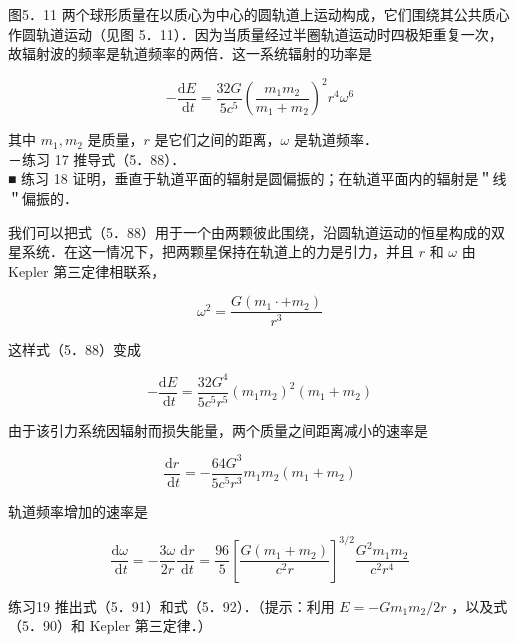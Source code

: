 图5．11 两个球形质量在以质心为中心的圆轨道上运动构成，它们围绕其公共质心作圆轨道运动（见图 5．11）．因为当质量经过半圈轨道运动时四极矩重复一次，故辐射波的频率是轨道频率的两倍．这一系统辐射的功率是


\begin{equation*}
	-\frac{\mathrm{d} E}{\mathrm{~d} t}=\frac{32 G}{5 c^{5}}\left(\frac{m_{1} m_{2}}{m_{1}+m_{2}}\right)^{2} r^{4} \omega^{6} \tag{5.88}
\end{equation*}


其中 $m_{1}, m_{2}$ 是质量，$r$ 是它们之间的距离，$\omega$ 是轨道频率．\\
－练习 17 推导式（5．88）．\\
■ 练习 18 证明，垂直于轨道平面的辐射是圆偏振的；在轨道平面内的辐射是＂线＂偏振的．

我们可以把式（5．88）用于一个由两颗彼此围绕，沿圆轨道运动的恒星构成的双星系统．在这一情况下，把两颗星保持在轨道上的力是引力，并且 $r$ 和 $\omega$ 由 Kepler 第三定律相联系，


\begin{equation*}
	\omega^{2}=\frac{G\left(m_{1} \cdot+m_{2}\right)}{r^{3}} \tag{5.89}
\end{equation*}


这样式（5．88）变成


\begin{equation*}
	-\frac{\mathrm{d} E}{\mathrm{~d} t}=\frac{32 G^{4}}{5 c^{5} r^{5}}\left(m_{1} m_{2}\right)^{2}\left(m_{1}+m_{2}\right) \tag{5.90}
\end{equation*}


由于该引力系统因辐射而损失能量，两个质量之间距离减小的速率是


\begin{equation*}
	\frac{\mathrm{d} r}{\mathrm{~d} t}=-\frac{64 G^{3}}{5 c^{5} r^{3}} m_{1} m_{2}\left(m_{1}+m_{2}\right) \tag{5.91}
\end{equation*}


轨道频率增加的速率是


\begin{equation*}
	\frac{\mathrm{d} \omega}{\mathrm{~d} t}=-\frac{3 \omega}{2 r} \frac{\mathrm{~d} r}{\mathrm{~d} t}=\frac{96}{5}\left[\frac{G\left(m_{1}+m_{2}\right)}{c^{2} r}\right]^{3 / 2} \frac{G^{2} m_{1} m_{2}}{c^{2} r^{4}} \tag{5.92}
\end{equation*}


练习19 推出式（5．91）和式（5．92）．（提示：利用 $E=-G m_{1} m_{2} / 2 r$ ，以及式 （5．90）和 Kepler 第三定律．）

